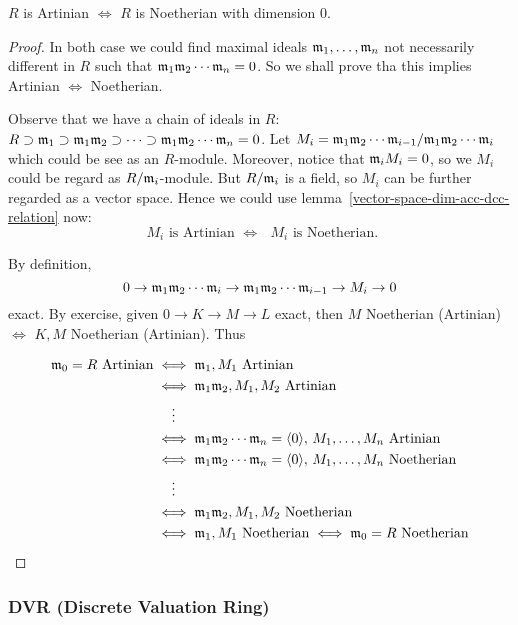 \begin{theorem}
  $R$ is Artinian $\iff$ $R$ is Noetherian with dimension $0$.


\begin{proof}
  In both case we could find maximal ideals $\mathfrak{m}_1, \dots, \mathfrak{m}_n$
  not necessarily different in $R$ such that $\mathfrak{m}_1\mathfrak{m}_2 \dotsm \mathfrak{m}_n = 0$.
  So we shall prove tha this implies Artinian $\iff$ Noetherian.

  Observe that we have a chain of ideals in $R$:
  $R \supset \mathfrak{m}_1 \supset \mathfrak{m}_1\mathfrak{m}_2 \supset \dots \supset
  \mathfrak{m}_1\mathfrak{m}_2\dotsm\mathfrak{m}_n = 0$.
  Let $M_i = {\mathfrak{m}_1\mathfrak{m}_2\dotsm\mathfrak{m}_{i-1}}/{\mathfrak{m}_1\mathfrak{m}_2\dotsm\mathfrak{m}_i}$
  which could be see as an $R$-module.
  Moreover, notice that $\mathfrak{m}_i M_i = 0$, so we $M_i$
  could be regard as ${R}/{\mathfrak{m}_i}$-module.
  But ${R}/{\mathfrak{m}_i}$ is a field, so $M_i$ can be further regarded as a vector
  space. Hence we could use lemma~\ref{vector-space-dim-acc-dcc-relation} now:
  \[
  \text{ $M_i$ is Artinian $\iff$ $M_i$ is Noetherian. }
  \]

  By definition,
  \[
    0 \to \mathfrak{m}_1\mathfrak{m}_2\dotsm\mathfrak{m}_i \to \mathfrak{m}_1\mathfrak{m}_2\dotsm\mathfrak{m}_{i-1}
    \to M_i \to 0
  \] exact.
  By exercise, given $0 \to K \to M \to L$ exact, then $M$ Noetherian (Artinian)
  $\iff$ $K, M$ Noetherian (Artinian). Thus

  \[
    \begin{aligned}
      \mathfrak{m}_0 = R \text{ Artinian} & \iff \mathfrak{m}_1 , M_1 \text{ Artinian} \\
      & \iff \mathfrak{m}_1 \mathfrak{m}_2 , M_1, M_2 \text{ Artinian} \\
      & \hspace{13pt} \vdots \\
      & \iff \mathfrak{m}_1 \mathfrak{m}_2 \cdots \mathfrak{m}_n = \langle0\rangle,\, M_1, 
      \dots, M_n \text{ Artinian} \\
      & \iff \mathfrak{m}_1 \mathfrak{m}_2 \cdots \mathfrak{m}_n = \langle0\rangle,\, M_1, 
      \dots, M_n \text{ Noetherian} \\
      & \hspace{13pt} \vdots \\
      & \iff \mathfrak{m}_1 \mathfrak{m}_2 , M_1, M_2 \text{ Noetherian} \\
      & \iff \mathfrak{m}_1 , M_1 \text{ Noetherian} \iff \mathfrak{m}_0 = R \text{ Noetherian}
    \end{aligned}
  \]
\end{proof}
\end{theorem}


\subsubsection{DVR (Discrete Valuation Ring)}

